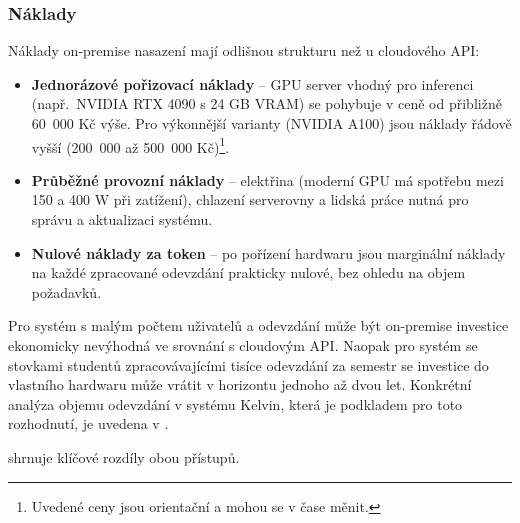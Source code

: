 \subsubsection*{Náklady}
\label{subsubsec:deployment-on-premise-costs}

Náklady on-premise nasazení mají odlišnou strukturu než u cloudového API:

\begin{itemize}
    \item \textbf{Jednorázové pořizovací náklady} -- GPU server vhodný pro inferenci (např.\ NVIDIA RTX 4090 s 24 GB VRAM) se pohybuje v ceně od přibližně 60~000 Kč výše.
    Pro výkonnější varianty (NVIDIA A100) jsou náklady řádově vyšší (200~000 až 500~000 Kč)\footnote{Uvedené ceny jsou orientační a mohou se v čase měnit.}.

    \item \textbf{Průběžné provozní náklady} -- elektřina (moderní GPU má spotřebu mezi 150 a 400 W při zatížení), chlazení serverovny a lidská práce nutná pro správu a aktualizaci systému.

    \item \textbf{Nulové náklady za token} -- po pořízení hardwaru jsou marginální náklady na každé zpracované odevzdání prakticky nulové, bez ohledu na objem požadavků.
\end{itemize}

Pro systém s malým počtem uživatelů a odevzdání může být on-premise investice ekonomicky nevýhodná ve srovnání s cloudovým API\@.
Naopak pro systém se stovkami studentů zpracovávajícími tisíce odevzdání za semestr se investice do vlastního hardwaru může vrátit v horizontu jednoho až dvou let.
Konkrétní analýza objemu odevzdání v systému Kelvin, která je podkladem pro toto rozhodnutí, je uvedena v .

 shrnuje klíčové rozdíly obou přístupů.

